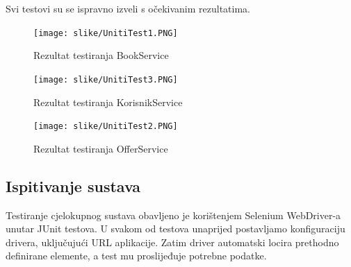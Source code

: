            Svi testovi su se ispravno izveli s očekivanim rezultatima. 
            \eject
			
			
			\begin{figure}[H]
				\texttt{[image: slike/UnitiTest1.PNG]} %
				\centering
				\caption{Rezultat testiranja BookService }
				\label{fig:BookService1}
			\end{figure}
			
			\eject
            \eject
			
			
			\begin{figure}[H]
				\texttt{[image: slike/UnitiTest3.PNG]} %
				\centering
				\caption{Rezultat testiranja KorisnikService }
				\label{fig:KorisnikService1}
			\end{figure}
			
			\eject
            \eject
			
			
			\begin{figure}[H]
				\texttt{[image: slike/UnitiTest2.PNG]} %
				\centering
				\caption{Rezultat testiranja OfferService}
				\label{fig:OfferService1}
			\end{figure}
			
			\eject
			
			
			
			
			
			\subsection{Ispitivanje sustava}
			
			 Testiranje cjelokupnog sustava obavljeno je korištenjem Selenium WebDriver-a unutar JUnit testova. U svakom od testova unaprijed postavljamo konfiguraciju drivera, uključujući URL aplikacije. Zatim driver automatski locira prethodno definirane elemente, a test mu proslijeđuje potrebne podatke.
    
